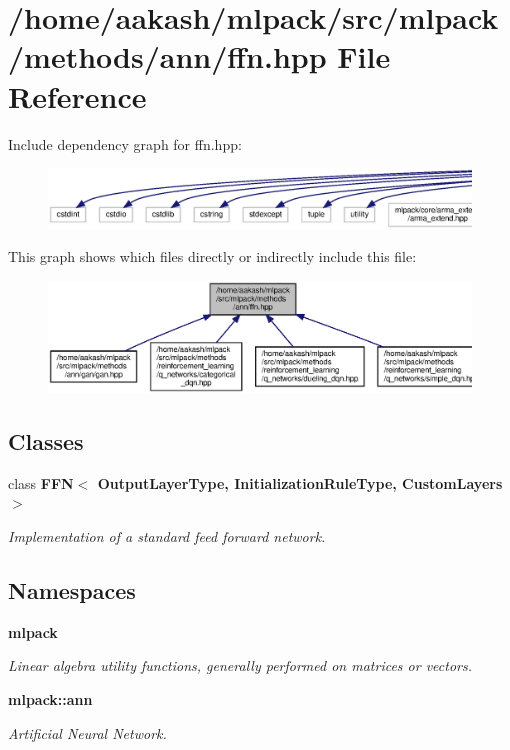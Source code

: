 \section{/home/aakash/mlpack/src/mlpack/methods/ann/ffn.hpp File Reference}
\label{ffn_8hpp}
Include dependency graph for ffn.\+hpp\+:
\nopagebreak
\begin{figure}[H]
\begin{center}
\leavevmode
\includegraphics[width=350pt]{ffn_8hpp__incl}
\end{center}
\end{figure}
This graph shows which files directly or indirectly include this file\+:
\nopagebreak
\begin{figure}[H]
\begin{center}
\leavevmode
\includegraphics[width=350pt]{ffn_8hpp__dep__incl}
\end{center}
\end{figure}
\subsection*{Classes}
\begin{DoxyCompactItemize}
\item 
class \textbf{ F\+F\+N$<$ Output\+Layer\+Type, Initialization\+Rule\+Type, Custom\+Layers $>$}
\begin{DoxyCompactList}\small\item\em Implementation of a standard feed forward network. \end{DoxyCompactList}\end{DoxyCompactItemize}
\subsection*{Namespaces}
\begin{DoxyCompactItemize}
\item 
 \textbf{ mlpack}
\begin{DoxyCompactList}\small\item\em Linear algebra utility functions, generally performed on matrices or vectors. \end{DoxyCompactList}\item 
 \textbf{ mlpack\+::ann}
\begin{DoxyCompactList}\small\item\em Artificial Neural Network. \end{DoxyCompactList}\end{DoxyCompactItemize}


